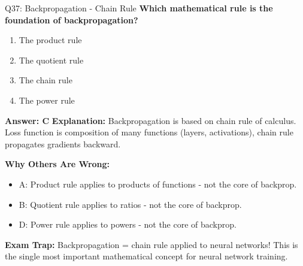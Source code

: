 \documentclass[8pt]{beamer}
\begin{document}
	\begin{frame}{Q37: Backpropagation - Chain Rule}
		\fontsize{6.5}{7.5}\selectfont
		\textbf{Which mathematical rule is the foundation of backpropagation?}
		
		\begin{enumerate}
			\item The product rule
			\item The quotient rule
			\item The chain rule
			\item The power rule
		\end{enumerate}
		
		\vspace{0.05cm}
		\textcolor{myblue}{\textbf{Answer: C}}
		\vspace{0.05cm}
		\textcolor{myblue}{\textbf{Explanation:}} Backpropagation is based on chain rule of calculus. Loss function is composition of many functions (layers, activations), chain rule propagates gradients backward.
		
		\vspace{0.05cm}
		\textcolor{myred}{\textbf{Why Others Are Wrong:}}
		\begin{itemize}
			\item \textcolor{myred}{A:} Product rule applies to products of functions - not the core of backprop.
			\item \textcolor{myred}{B:} Quotient rule applies to ratios - not the core of backprop.
			\item \textcolor{myred}{D:} Power rule applies to powers - not the core of backprop.
		\end{itemize}
		
		\textcolor{myred}{\textbf{Exam Trap:}} Backpropagation = \textcolor{myblue}{chain rule} applied to neural networks! This is the single most important mathematical concept for neural network training.
	\end{frame}
	
\end{document}
